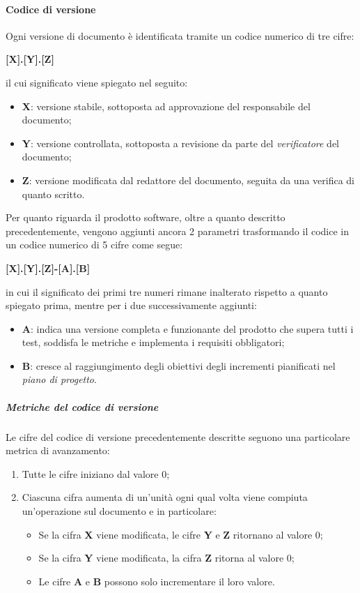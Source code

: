         \paragraph{Codice di versione}
        Ogni versione di documento è identificata tramite un codice numerico di tre cifre:
        \begin{center}
            \Large \textbf{[X].[Y].[Z]}
        \end{center}
        il cui significato viene spiegato nel seguito:
        \begin{itemize}
            \item \textbf{X}: versione stabile, sottoposta ad approvazione del responsabile del documento;
            \item \textbf{Y}: versione controllata, sottoposta a revisione da parte del \textit{verificatore} del documento;
            \item \textbf{Z}: versione modificata dal redattore del documento, seguita da una verifica di quanto scritto.
        \end{itemize}
        Per quanto riguarda il prodotto software, oltre a quanto descritto precedentemente, vengono aggiunti ancora 2 parametri trasformando il codice in un codice numerico di 5 cifre come segue:
        \begin{center}
            \Large \textbf{[X].[Y].[Z]-[A].[B]}
        \end{center}
        in cui il significato dei primi tre numeri rimane inalterato rispetto a quanto spiegato prima, mentre per i due successivamente aggiunti:
        \begin{itemize}
            \item \textbf{A}: indica una versione completa e funzionante del prodotto che supera tutti i test, soddisfa le metriche e implementa i requisiti obbligatori;
            \item \textbf{B}: cresce al raggiungimento degli obiettivi degli incrementi pianificati nel \textit{piano di progetto}.
        \end{itemize}

            \subparagraph{Metriche del codice di versione}
            Le cifre del codice di versione precedentemente descritte seguono una particolare metrica di avanzamento:
            \begin{enumerate}
                \item Tutte le cifre iniziano dal valore 0;
                \item Ciascuna cifra aumenta di un'unità ogni qual volta viene compiuta un'operazione sul documento e in particolare:
                \begin{itemize}
                    \item Se la cifra \textbf{X} viene modificata, le cifre \textbf{Y} e \textbf{Z} ritornano al valore 0;
                    \item Se la cifra \textbf{Y} viene modificata, la cifra \textbf{Z} ritorna al valore 0;
                    \item Le cifre \textbf{A} e \textbf{B} possono solo incrementare il loro valore.
                \end{itemize}
            \end{enumerate}

